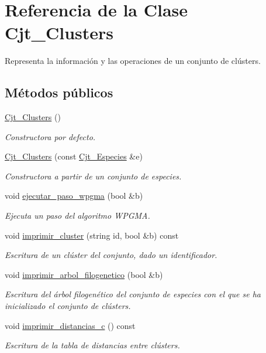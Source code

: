 \hypertarget{class_cjt___clusters}{}\section{Referencia de la Clase Cjt\+\_\+\+Clusters}
\label{class_cjt___clusters}


Representa la información y las operaciones de un conjunto de clústers.  


\subsection*{Métodos públicos}
\begin{DoxyCompactItemize}
\item 
\hyperlink{class_cjt___clusters_a2e55759944a78043744103e19dd87c1c}{Cjt\+\_\+\+Clusters} ()
\begin{DoxyCompactList}\small\item\em Constructora por defecto. \end{DoxyCompactList}\item 
\hyperlink{class_cjt___clusters_a11e683ee54988d48d34c9cb2f6d52be6}{Cjt\+\_\+\+Clusters} (const \hyperlink{class_cjt___especies}{Cjt\+\_\+\+Especies} \&e)
\begin{DoxyCompactList}\small\item\em Constructora a partir de un conjunto de especies. \end{DoxyCompactList}\item 
void \hyperlink{class_cjt___clusters_a4675196f92740eda90fcbdf7942ee04b}{ejecutar\+\_\+paso\+\_\+wpgma} (bool \&b)
\begin{DoxyCompactList}\small\item\em Ejecuta un paso del algoritmo W\+P\+G\+MA. \end{DoxyCompactList}\item 
void \hyperlink{class_cjt___clusters_add140d48281573802396c267f0d15cee}{imprimir\+\_\+cluster} (string id, bool \&b) const
\begin{DoxyCompactList}\small\item\em Escritura de un clúster del conjunto, dado un identificador. \end{DoxyCompactList}\item 
void \hyperlink{class_cjt___clusters_a289dfd3307b383620edc1f901dced7b0}{imprimir\+\_\+arbol\+\_\+filogenetico} (bool \&b)
\begin{DoxyCompactList}\small\item\em Escritura del árbol filogenético del conjunto de especies con el que se ha inicializado el conjunto de clústers. \end{DoxyCompactList}\item 
void \hyperlink{class_cjt___clusters_a8caa8d4eae15730feccea2ce7d22a196}{imprimir\+\_\+distancias\+\_\+c} () const
\begin{DoxyCompactList}\small\item\em Escritura de la tabla de distancias entre clústers. \end{DoxyCompactList}\end{DoxyCompactItemize}
